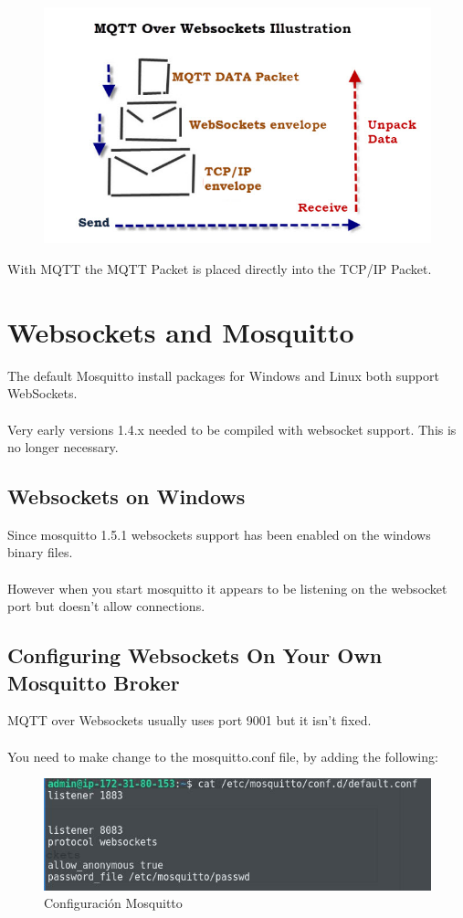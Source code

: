 \documentclass[oneside]{book}
\begin{document}
\begin{figure}[H]
\centering
\includegraphics[scale=1]{images/mqtt_websocket.jpg}
\end{figure}
With MQTT the MQTT Packet is placed directly into the TCP/IP Packet.

\section{Websockets and Mosquitto}
The default Mosquitto install packages for Windows and Linux both support WebSockets.
\\\\
Very early versions 1.4.x needed to be compiled with websocket support. This is no longer necessary.	

\subsection{Websockets on Windows}
Since mosquitto 1.5.1 websockets support has been enabled on the windows binary files.
\\\\
However when you start mosquitto it appears to be listening on the websocket port but doesn’t allow connections.

\subsection{Configuring Websockets On Your Own Mosquitto Broker}
MQTT over Websockets usually uses port 9001 but it isn’t fixed.
\\\\
You need to make change to the mosquitto.conf file, by adding the following:
\begin{figure}[H]
\centering
\includegraphics[scale=1]{images/mosquitto_setup.jpg}
\caption{Configuración Mosquitto}
\end{figure}
\end{document}
